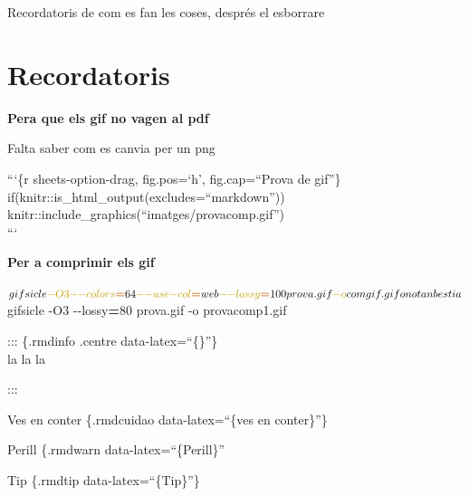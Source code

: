 \documentclass[
  10pt,
]{krantz}
\newenvironment{Shaded}{\begin{snugshade}}{\end{snugshade}}
\newcommand{\AttributeTok}[1]{\textcolor[rgb]{0.77,0.63,0.00}{#1}}
\newcommand{\ExtensionTok}[1]{#1}
\newcommand{\NormalTok}[1]{#1}
\newcommand{\OperatorTok}[1]{\textcolor[rgb]{0.81,0.36,0.00}{\textbf{#1}}}
\begin{document}
Recordatoris de com es fan les coses, després el esborrare

\hypertarget{recordatoris}{%
\section{Recordatoris}\label{recordatoris}}

\textbf{Pera que els gif no vagen al pdf}

Falta saber com es canvia per un png

```\{r sheets-option-drag, fig.pos=`h', fig.cap=``Prova de gif''\}\\
if(knitr::is\_html\_output(excludes=``markdown'')) knitr::include\_graphics(``imatges/provacomp.gif'')\\
```

\textbf{Per a comprimir els gif}

\begin{Shaded}
\begin{Highlighting}[]
\ExtensionTok{$}\NormalTok{ gifsicle }\AttributeTok{{-}O3} \AttributeTok{{-}{-}colors}\OperatorTok{=}\NormalTok{64 }\AttributeTok{{-}{-}use{-}col}\OperatorTok{=}\NormalTok{web }\AttributeTok{{-}{-}lossy}\OperatorTok{=}\NormalTok{100 prova.gif }\AttributeTok{{-}o}\NormalTok{ comgif.gif  }
\ExtensionTok{o}\NormalTok{ no tan bestia  }
\ExtensionTok{$}\NormalTok{ gifsicle }\AttributeTok{{-}O3} \AttributeTok{{-}{-}lossy}\OperatorTok{=}\NormalTok{80 prova.gif }\AttributeTok{{-}o}\NormalTok{ provacomp1.gif  }
\end{Highlighting}
\end{Shaded}

\begin{rmdinfo}{}
::: \{.rmdinfo .centre data-latex=``\{\}''\}\\
la la la\\

\end{rmdinfo}

:::

\begin{rmdcuidao}{Ves en conter}
\{.rmdcuidao data-latex=``\{ves en conter\}''\}

\end{rmdcuidao}

\begin{rmdwarn}{Perill}
\{.rmdwarn data-latex=``\{Perill\}''

\end{rmdwarn}

\begin{rmdtip}{Tip}
\{.rmdtip data-latex=``\{Tip\}''\}

\end{rmdtip}
\end{document}
